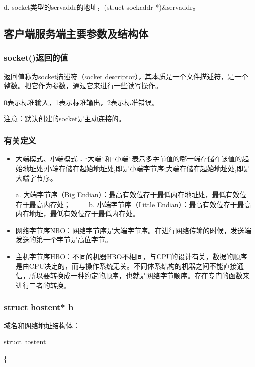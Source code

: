 \documentclass[UTF8]{article}%
\begin{document}
d. socket类型的servaddr的地址，(struct sockaddr *)\&servaddr。

\subsection{客户端服务端主要参数及结构体}

\subsubsection{socket()返回的值}

返回值称为socket描述符（socket descriptor），其本质是一个文件描述符，是一个整数。把它作为参数，通过它来进行一些读写操作。

0表示标准输入，1表示标准输出，2表示标准错误。

注意：默认创建的socket是主动连接的。

\subsubsection{有关定义}

\begin{itemize}
    \item 大端模式、小端模式：“大端”和”小端”表示多字节值的哪一端存储在该值的起始地址处;小端存储在起始地址处,即是小端字节序;大端存储在起始地址处,即是大端字节序。
    
    a. 大端字节序（Big Endian）：最高有效位存于最低内存地址处，最低有效位存于最高内存处；
　　 
    b. 小端字节序（Little Endian）：最高有效位存于最高内存地址，最低有效位存于最低内存处。

    \item 网络字节序NBO：网络字节序是大端字节序。在进行网络传输的时候，发送端发送的第一个字节是高位字节。
    \item 主机字节序HBO：不同的机器HBO不相同，与CPU的设计有关，数据的顺序是由CPU决定的，而与操作系统无关。不同体系结构的机器之间不能直接通信，所以要转换成一种约定的顺序，也就是网络字节顺序。存在专门的函数来进行二者的转换。

\end{itemize}

\subsubsection{struct hostent* h}

域名和网络地址结构体：

struct hostent

\{
\end{document}
